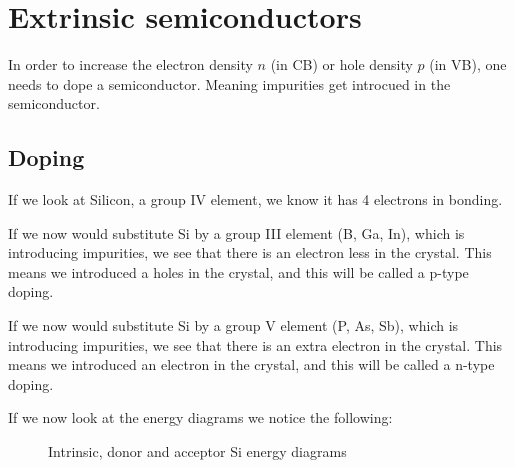 \chapter{Extrinsic semiconductors}
In order to increase the electron density $n$ (in CB) or hole density $p$ (in VB), one needs to dope a semiconductor. Meaning impurities get introcued in the semiconductor.

\section{Doping}
If we look at Silicon, a group IV element, we know it has 4 electrons in bonding. \par If we now would substitute Si by a group III element (B, Ga, In), which is introducing impurities, we see that there is an electron less in the crystal. This means we introduced a holes in the crystal, and this will be called a p-type doping. \par If we now would substitute Si by a group V element (P, As, Sb), which is introducing impurities, we see that there is an extra electron in the crystal. This means we introduced an electron in the crystal, and this will be called a n-type doping. \\ \par
If we now look at the energy diagrams we notice the following:
\begin{figure}
	\centering
	\caption{Intrinsic, donor and acceptor Si energy diagrams}
	\label{fig:donor_acceptor}
\end{figure}
